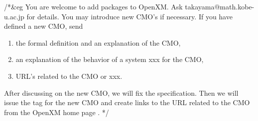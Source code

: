 /*&eg
You are welcome to add packages to OpenXM.
Ask takayama@math.kobe-u.ac.jp for details.
You may introduce new CMO's if necessary.
If you have defined a new CMO, send 
\begin{enumerate}
\item the formal definition and an explanation of the CMO,
\item an explanation of the behavior of a system xxx for the CMO,
\item URL's related to the CMO or xxx.
\end{enumerate}
After discussing on the new CMO, we will fix the specification.
Then we will issue the tag for the new CMO and create links to
the URL related to the CMO from the OpenXM home page \cite{openxxx}.
*/
